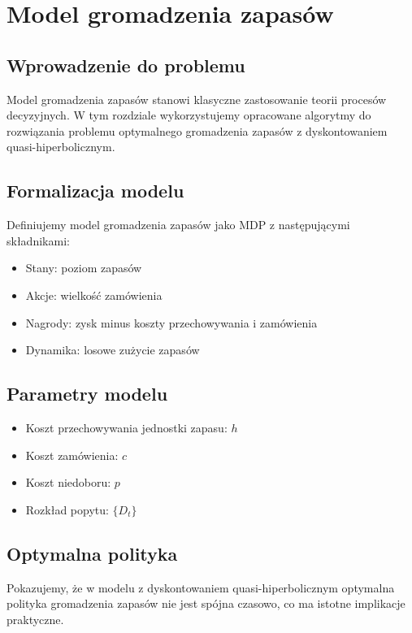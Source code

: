 \chapter{Model gromadzenia zapasów}

\section{Wprowadzenie do problemu}

Model gromadzenia zapasów stanowi klasyczne zastosowanie teorii procesów decyzyjnych. W tym rozdziale wykorzystujemy opracowane algorytmy do rozwiązania problemu optymalnego gromadzenia zapasów z dyskontowaniem quasi-hiperbolicznym.

\section{Formalizacja modelu}

Definiujemy model gromadzenia zapasów jako MDP z następującymi składnikami:
\begin{itemize}
\item Stany: poziom zapasów
\item Akcje: wielkość zamówienia  
\item Nagrody: zysk minus koszty przechowywania i zamówienia
\item Dynamika: losowe zużycie zapasów
\end{itemize}

\section{Parametry modelu}

\begin{itemize}
\item Koszt przechowywania jednostki zapasu: $h$
\item Koszt zamówienia: $c$ 
\item Koszt niedoboru: $p$
\item Rozkład popytu: $\{D_t\}$
\end{itemize}

\section{Optymalna polityka}

Pokazujemy, że w modelu z dyskontowaniem quasi-hiperbolicznym optymalna polityka gromadzenia zapasów nie jest spójna czasowo, co ma istotne implikacje praktyczne.

